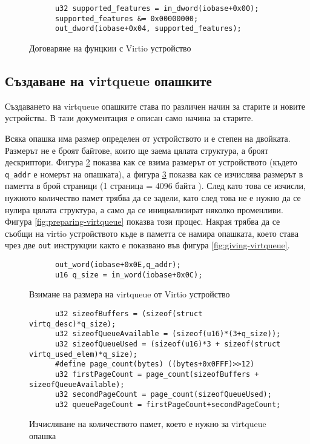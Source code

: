   \begin{figure}[htpb]
    \centering
    \begin{verbatim}
      u32 supported_features = in_dword(iobase+0x00);
      supported_features &= 0x00000000;
      out_dword(iobase+0x04, supported_features);
    \end{verbatim}
    \caption{Договаряне на фунцкии с Virtio устройство}
    \label{fig:disabling-all-features}
  \end{figure}

  \subsection{Създаване на virtqueue опашките}
  Създаването на virtqueue опашките става по различен начин за старите и новите устройства. В тази документация е описан само начина за старите.

  Всяка опашка има размер определен от устройството и е степен на двойката. Размерът не е броят байтове, които ще заема цялата структура, а броят дескриптори.\cite[глава~2.4]{virtiodocs} Фигура \ref{fig:getting-virtqueue-size} показва как се взима размерът от устройството (където {\tt q\_addr} е номерът на опашката), а фигура \ref{fig:calculating-virtqueue-size} показва как се изчислява размерът в паметта в брой страници (1 страница = 4096 байта \cite[глава~4.1.5.1.3.1]{virtiodocs}). След като това се изчисли, нужното количество памет трябва да се задели, като след това не е нужно да се нулира цялата структура, а само да се инициализират няколко променливи. Фигура \ref{fig:preparing-virtqueue} показва този процес. Накрая трябва да се съобщи на virtio устройството къде в паметта се намира опашката, което става чрез две {\tt out} инструкции както е показвано във фигура \ref{fig:giving-virtqueue}.

  \begin{figure}[htpb]
    \centering
    \begin{verbatim}
      out_word(iobase+0x0E,q_addr);
      u16 q_size = in_word(iobase+0x0C);
    \end{verbatim}
    \caption{Взимане на размера на virtqueue от Virtio устройство}
    \label{fig:getting-virtqueue-size}
  \end{figure}

  \begin{figure}[htpb]
    \centering
    \begin{verbatim}
      u32 sizeofBuffers = (sizeof(struct virtq_desc)*q_size);
      u32 sizeofQueueAvailable = (sizeof(u16)*(3+q_size));
      u32 sizeofQueueUsed = (sizeof(u16)*3 + sizeof(struct virtq_used_elem)*q_size);
      #define page_count(bytes) ((bytes+0x0FFF)>>12)
      u32 firstPageCount = page_count(sizeofBuffers + sizeofQueueAvailable);
      u32 secondPageCount = page_count(sizeofQueueUsed);
      u32 queuePageCount = firstPageCount+secondPageCount;
    \end{verbatim}
    \caption{Изчисляване на количеството памет, което е нужно за virtqueue опашка}
    \label{fig:calculating-virtqueue-size}
  \end{figure}

